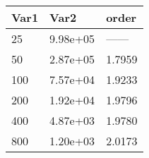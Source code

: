 \begin{tabular}{lll}
Var1 & Var2 & order \\ 
\hline 
25 & 9.98e+05 & ------ \\ 
50 & 2.87e+05 & 1.7959 \\ 
100 & 7.57e+04 & 1.9233 \\ 
200 & 1.92e+04 & 1.9796 \\ 
400 & 4.87e+03 & 1.9780 \\ 
800 & 1.20e+03 & 2.0173 \\ 
\hline 
\end{tabular}